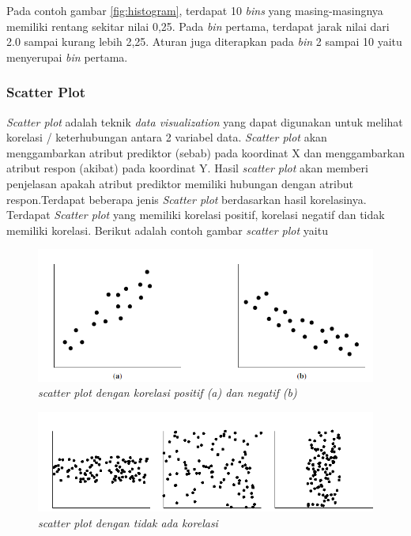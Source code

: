 \documentclass[a4paper,twoside]{article}
\begin{document}
\begin{enumerate}
 Pada contoh gambar \ref{fig:histogram}, terdapat 10 \textit{bins} yang masing-masingnya memiliki rentang sekitar nilai 0,25. Pada \textit{bin} pertama, terdapat jarak nilai dari 2.0 sampai kurang lebih 2,25. Aturan juga diterapkan pada \textit{bin} 2 sampai 10 yaitu menyerupai  \textit{bin} pertama. \\ 
		\subsubsection{\textbf{Scatter Plot}} 
		
 \textit{Scatter plot} adalah teknik \textit{data visualization} yang dapat digunakan untuk melihat korelasi / keterhubungan antara 2 variabel data. \textit{Scatter plot} akan menggambarkan atribut prediktor (sebab) pada koordinat X dan menggambarkan atribut respon (akibat) pada koordinat Y. Hasil \textit{scatter plot} akan memberi penjelasan apakah atribut prediktor memiliki hubungan dengan atribut respon.Terdapat beberapa jenis \textit{Scatter plot} berdasarkan hasil korelasinya. Terdapat \textit{Scatter plot} yang memiliki korelasi positif, korelasi negatif dan tidak memiliki korelasi. Berikut adalah contoh gambar \textit{scatter plot} yaitu
 
\pagebreak
		\begin{figure}[h!]
		\centering  
		\includegraphics[scale=0.7]{scatterplotcorrelation}   
		\caption{\textit{scatter plot dengan korelasi positif (a) dan negatif (b)}}
		\label{fig:scatterplotcorrelation} 
	\end{figure} 
	
	\begin{figure}[h!]
		\centering  
		\includegraphics[scale=0.7]{scatterplotwithoutcorrelation}   
		\caption{\textit{scatter plot dengan tidak ada korelasi }}
		\label{fig:scatterplotwithoutcorrelation} 
	\end{figure} 
	

\end{enumerate}
\end{document}
